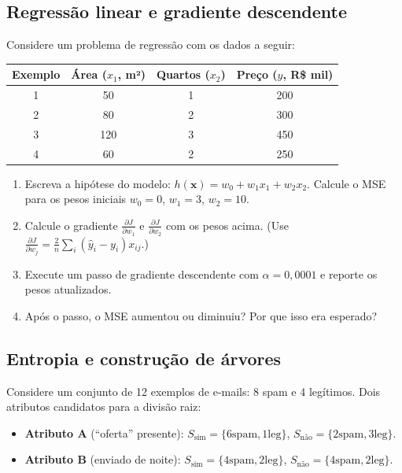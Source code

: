 \documentclass[12pt,a4paper]{article}
\begin{document}
\subsection{Regressão linear e gradiente descendente}

Considere um problema de regressão com os dados a seguir:

\medskip
\begin{center}
\begin{tabular}{cccc}
\toprule
Exemplo & Área ($x_1$, m²) & Quartos ($x_2$) & Preço ($y$, R\$ mil) \\
\midrule
1 & 50 & 1 & 200 \\
2 & 80 & 2 & 300 \\
3 & 120& 3 & 450 \\
4 & 60 & 2 & 250 \\
\bottomrule
\end{tabular}
\end{center}

\begin{enumerate}[label=(\alph*)]
    \item Escreva a hipótese do modelo: $h(\mathbf{x}) = w_0 + w_1 x_1 + w_2 x_2$. Calcule o MSE para os pesos iniciais $w_0 = 0$, $w_1 = 3$, $w_2 = 10$.
    \item Calcule o gradiente $\frac{\partial J}{\partial w_1}$ e $\frac{\partial J}{\partial w_2}$ com os pesos acima. (Use $\frac{\partial J}{\partial w_j} = \frac{2}{n} \sum_i (\hat{y}_i - y_i) x_{ij}$.)
    \item Execute um passo de gradiente descendente com $\alpha = 0{,}0001$ e reporte os pesos atualizados.
    \item Após o passo, o MSE aumentou ou diminuiu? Por que isso era esperado?
\end{enumerate}

\subsection{Entropia e construção de árvores}

Considere um conjunto de 12 exemplos de e-mails: 8 spam e 4 legítimos. Dois atributos candidatos para a divisão raiz:

\begin{itemize}
    \item \textbf{Atributo A} (``oferta'' presente): $S_{\text{sim}} = \{6\text{spam}, 1\text{leg}\}$, $S_{\text{não}} = \{2\text{spam}, 3\text{leg}\}$.
    \item \textbf{Atributo B} (enviado de noite): $S_{\text{sim}} = \{4\text{spam}, 2\text{leg}\}$, $S_{\text{não}} = \{4\text{spam}, 2\text{leg}\}$.
\end{itemize}
\end{document}
